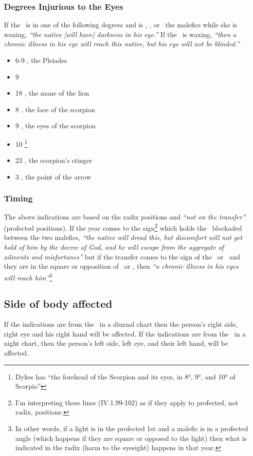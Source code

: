 \subsubsection{Degrees Injurious to the Eyes}
If  the \Moon\, is in one of the following degrees and is \Conjunction, \Square, or \Opposition\, the malefics while she is waning, \textsl{``the native [will have] darkness in his eye.''} If the \Moon\, is waxing, \textsl{``then a chronic illness in his eye will reach this native, but his eye will not be blinded.''}
\begin{itemize}[topsep=0em,itemsep=0em]
\item 6-9 \Taurus, the Pleiades
\item 9 \Cancer
\item 18 \Leo, the mane of the lion
\item 8 \Scorpio, the face of the scorpion
\item 9 \Scorpio, the eyes of the scorpion
\item 10 \Scorpio\footnote{Dykes has ``the forehead of the Scorpion and its eyes, in 8°, 9°, and 10° of Scorpio''}
\item 23 \Scorpio, the scorpion's stinger
\item 3 \Sagittarius, the point of the arrow
\end{itemize}


\subsubsection{Timing}
The  above indications are based on the radix positions and \textsl{``not on the transfer''} (profected positions). If the year comes to the sign\footnote{I'm interpreting these lines (IV.1.99-102) as if they apply to profected, not radix, positions.} which holds the \Moon\, blockaded between the two malefics, \textsl{``the native will dread this, but discomfort will not get hold of him by the decree of God, and he will escape from the aggregate of ailments and misfortunes''} but if the transfer comes to the sign of the \Sun\, or \Moon\, and they are in the square or opposition of \Saturn\, or \Mars, then \textsl{``a chronic illness in his eyes will reach him''}\footnote{In other words, if a light is in the profected 1st and a malefic is in a profected angle (which happens if they are square or opposed to the light) then what is indicated in the radix (harm to the eyesight) happens in that year.}

\subsection{Side of body affected}
If  the indications are from the \Sun\, in a diurnal chart then the person's right side, right eye and his right hand will be affected. If the indications are from the \Moon\, in a night chart, then the person's left side, left eye, and their left hand, will be affected. 


